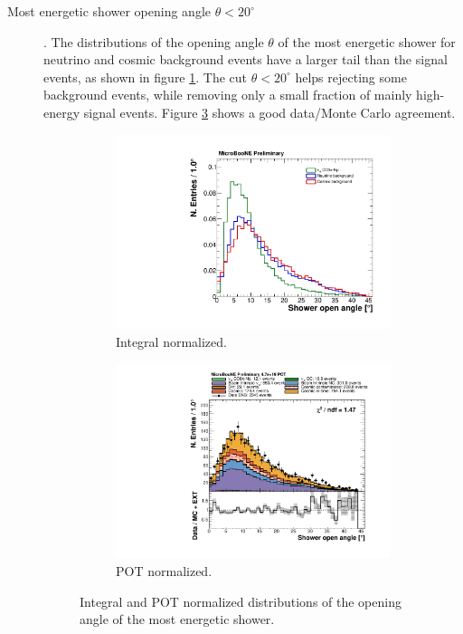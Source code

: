 \begin{description}
\item[Most energetic shower opening angle $\theta < 20^{\circ}$]. The distributions of the opening angle $\theta$ of the most energetic shower for neutrino and cosmic background events have a larger tail than the signal events, as shown in figure \ref{fig:open_integral}. The cut $\theta < 20^{\circ}$ helps rejecting some background events, while removing only a small fraction of mainly high-energy signal events. Figure \ref{fig:open_pot} shows a good data/Monte Carlo agreement.

\begin{figure}[htbp]
\centering
  \begin{subfigure}{0.45\textwidth}
    \includegraphics[width=\linewidth]{figures/h_shower_open_angle_norm.pdf}
    \caption{Integral normalized.} \label{fig:open_integral}
  \end{subfigure}
    \begin{subfigure}{0.45\textwidth}
    \includegraphics[width=\linewidth]{figures/h_shower_open_angle.pdf}
    \caption{POT normalized.} \label{fig:open_pot}
  \end{subfigure}
  \caption{Integral and POT normalized distributions of the opening angle of the most energetic shower.}
\end{figure}


\end{description}
